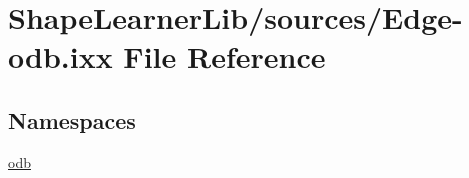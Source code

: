 \hypertarget{_edge-odb_8ixx}{}\section{Shape\+Learner\+Lib/sources/\+Edge-\/odb.ixx File Reference}
\label{_edge-odb_8ixx}
\subsection*{Namespaces}
\begin{DoxyCompactItemize}
\item 
 \hyperlink{namespaceodb}{odb}
\end{DoxyCompactItemize}
